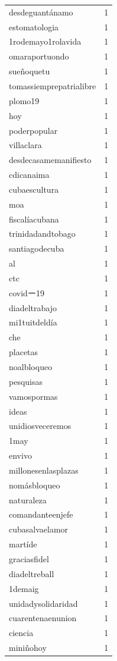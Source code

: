 \begin{tabular}{lr}
desdeguantánamo & 1 \\
estomatologia & 1 \\
1rodemayo1rolavida & 1 \\
omaraportuondo & 1 \\
sueñoquetu & 1 \\
tomassiemprepatrialibre & 1 \\
plomo19 & 1 \\
hoy & 1 \\
poderpopular & 1 \\
villaclara & 1 \\
desdecasamemanifiesto & 1 \\
cdicanaima & 1 \\
cubaescultura & 1 \\
moa & 1 \\
fiscalíacubana & 1 \\
trinidadandtobago & 1 \\
santiagodecuba & 1 \\
al & 1 \\
ctc & 1 \\
covidー19 & 1 \\
diadeltrabajo & 1 \\
mi1tuitdeldía & 1 \\
che & 1 \\
placetas & 1 \\
noalbloqueo & 1 \\
pesquisas & 1 \\
vamospormas & 1 \\
ideas & 1 \\
unidiosveceremos & 1 \\
1may & 1 \\
envivo & 1 \\
millonesenlasplazas & 1 \\
nomásbloqueo & 1 \\
naturaleza & 1 \\
comandanteenjefe & 1 \\
cubasalvaelamor & 1 \\
martíde & 1 \\
graciasfidel & 1 \\
diadeltreball & 1 \\
1demaig & 1 \\
unidadysolidaridad & 1 \\
cuarentenaenunion & 1 \\
ciencia & 1 \\
miniñohoy & 1 \\

\end{tabular}
